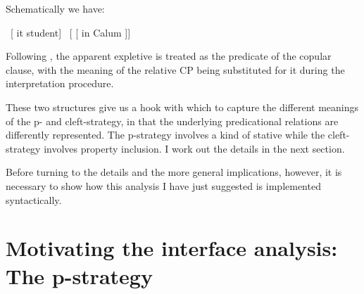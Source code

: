 \documentclass[output=paper]{langsci/langscibook}
\begin{document}
%
%

Schematically we have:

\ea \ [ \Cop{} it student]  \ [ [  in Calum ]] \z

Following \citet{adger-ramchand:05}, the apparent expletive is treated as the
predicate of the copular clause, with the meaning of the relative CP being
substituted for it during the interpretation procedure.

These two structures give us a hook with which to capture the different
meanings of the p- and cleft-strategy, in that the underlying predicational
relations are differently represented. The p-strategy involves a kind of
stative  while the cleft-strategy involves property inclusion.  I
work out the details in the next section.

%
%

Before turning to the details and the more general implications, however, it is
necessary to show how this analysis I have just suggested is  implemented
syntactically.

\section{Motivating the interface analysis: The p-strategy}
\end{document}
